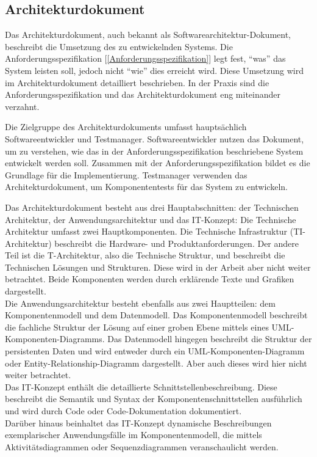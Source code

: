 \subsection{Architekturdokument}  \label{Architekturdokument}

Das Architekturdokument, auch bekannt als Softwarearchitektur-Dokument, beschreibt die Umsetzung des zu entwickelnden 
Systems. Die Anforderungsspezifikation [\ref{Anforderungsspezifikation}] legt fest, ``was'' das System leisten soll, 
jedoch nicht ``wie'' dies erreicht wird. Diese Umsetzung wird im Architekturdokument detailliert beschrieben. In der 
Praxis sind die Anforderungsspezifikation und das Architekturdokument eng miteinander verzahnt.

Die Zielgruppe des Architekturdokuments umfasst hauptsächlich Softwareentwickler und Testmanager. Softwareentwickler 
nutzen das Dokument, um zu verstehen, wie das in der Anforderungsspezifikation beschriebene System entwickelt werden 
soll. Zusammen mit der Anforderungsspezifikation bildet es die Grundlage für die Implementierung. Testmanager verwenden 
das Architekturdokument, um Komponententests für das System zu entwickeln.

Das Architekturdokument besteht aus drei Hauptabschnitten: der Technischen Architektur, der Anwendungsarchitektur 
und das IT-Konzept:
Die Technische Architektur umfasst zwei Hauptkomponenten. Die Technische Infrastruktur (TI-Architektur) beschreibt 
die Hardware- und Produktanforderungen.
Der andere Teil ist die T-Architektur, also die Technische Struktur, und beschreibt die Technischen Lösungen und Strukturen.
Diese wird in der Arbeit aber nicht weiter betrachtet.
Beide Komponenten werden durch erklärende Texte und Grafiken dargestellt.\\
Die Anwendungsarchitektur besteht ebenfalls aus zwei Hauptteilen: dem Komponentenmodell und dem Datenmodell. Das 
Komponentenmodell beschreibt die fachliche Struktur der Lösung auf einer groben Ebene mittels eines 
UML-Komponenten-Diagramms. Das Datenmodell hingegen beschreibt die Struktur der persistenten Daten und wird 
entweder durch ein UML-Komponenten-Diagramm oder Entity-Relationship-Diagramm dargestellt. Aber auch dieses wird hier 
nicht weiter betrachtet.\\
Das IT-Konzept enthält die detaillierte Schnittstellenbeschreibung. Diese beschreibt die Semantik und Syntax der 
Komponentenschnittstellen ausführlich und wird durch Code oder Code-Dokumentation dokumentiert.\\ 
Darüber hinaus beinhaltet das IT-Konzept dynamische Beschreibungen exemplarischer Anwendungsfälle im Komponentenmodell, die mittels 
Aktivitätsdiagrammen oder Sequenzdiagrammen veranschaulicht werden.

